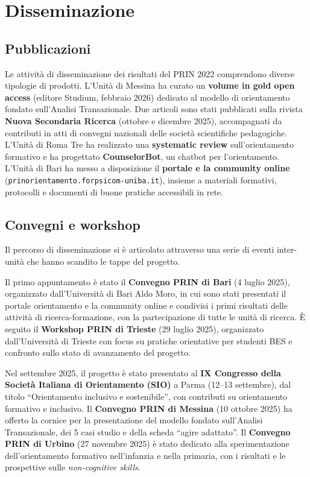 \documentclass[12pt,a4paper]{article}
\begin{document}
\section{Disseminazione}
\label{sec:disseminazione}

\subsection{Pubblicazioni}

Le attivit\`a di disseminazione dei risultati del PRIN 2022 comprendono diverse tipologie di prodotti. L'Unit\`a di Messina ha curato un \textbf{volume in gold open access} (editore Studium, febbraio 2026) dedicato al modello di orientamento fondato sull'Analisi Transazionale. Due articoli sono stati pubblicati sulla rivista \textbf{Nuova Secondaria Ricerca} (ottobre e dicembre 2025), accompagnati da contributi in atti di convegni nazionali delle societ\`a scientifiche pedagogiche. L'Unit\`a di Roma Tre ha realizzato una \textbf{systematic review} sull'orientamento formativo e ha progettato \textbf{CounselorBot}, un chatbot per l'orientamento. L'Unit\`a di Bari ha messo a disposizione il \textbf{portale e la community online} (\texttt{prinorientamento.forpsicom-uniba.it}), insieme a materiali formativi, protocolli e documenti di buone pratiche accessibili in rete.

\subsection{Convegni e workshop}

Il percorso di disseminazione si \`e articolato attraverso una serie di eventi inter-unit\`a che hanno scandito le tappe del progetto.

Il primo appuntamento \`e stato il \textbf{Convegno PRIN di Bari} (4 luglio 2025), organizzato dall'Universit\`a di Bari Aldo Moro, in cui sono stati presentati il portale orientamento e la community online e condivisi i primi risultati delle attivit\`a di ricerca-formazione, con la partecipazione di tutte le unit\`a di ricerca. \`E seguito il \textbf{Workshop PRIN di Trieste} (29 luglio 2025), organizzato dall'Universit\`a di Trieste con focus su pratiche orientative per studenti BES e confronto sullo stato di avanzamento del progetto.

Nel settembre 2025, il progetto \`e stato presentato al \textbf{IX Congresso della Societ\`a Italiana di Orientamento (SIO)} a Parma (12--13 settembre), dal titolo ``Orientamento inclusivo e sostenibile'', con contributi su orientamento formativo e inclusivo. Il \textbf{Convegno PRIN di Messina} (10 ottobre 2025) ha offerto la cornice per la presentazione del modello fondato sull'Analisi Transazionale, dei 5 casi studio e della scheda ``agire adattato''. Il \textbf{Convegno PRIN di Urbino} (27 novembre 2025) \`e stato dedicato alla sperimentazione dell'orientamento formativo nell'infanzia e nella primaria, con i risultati e le prospettive sulle \textit{non-cognitive skills}.
\end{document}
